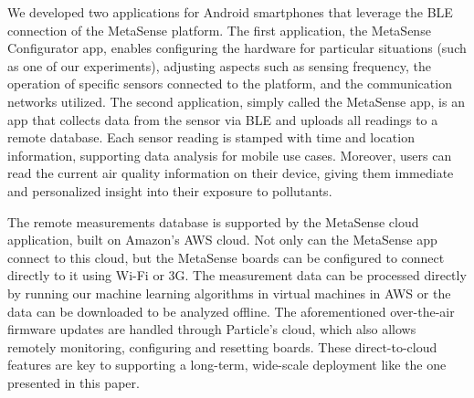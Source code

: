 \documentclass[journal abbreviation, manuscript]{copernicus}
\newcommand{\textus}[1]{$_{\text{#1}}$}
\begin{document}
We developed two applications for Android smartphones that leverage the BLE connection of the MetaSense platform. The first application, the MetaSense Configurator app, enables configuring the hardware for particular situations (such as one of our experiments), adjusting aspects such as sensing frequency, the operation of specific sensors connected to the platform, and the communication networks utilized.  The second application, simply called the MetaSense app, is an app that collects data from the sensor via BLE and uploads all readings to a remote database.  Each sensor reading is stamped with time and location information, supporting data analysis for mobile use cases. Moreover, users can read the current air quality information on their device, giving them immediate and personalized insight into their exposure to pollutants.


The remote measurements database is supported by the MetaSense cloud application, built on Amazon's AWS cloud.  Not only can the MetaSense app connect to this cloud, but the MetaSense boards can be configured to connect directly to it using Wi-Fi or 3G.  The measurement data can be processed directly by running our machine learning algorithms in virtual machines in AWS or the data can be downloaded to be analyzed offline.  The aforementioned over-the-air firmware updates are handled through Particle's cloud, which also allows remotely monitoring, configuring and resetting boards. These direct-to-cloud features are key to supporting a long-term, wide-scale deployment like the one presented in this paper.
\end{document}
